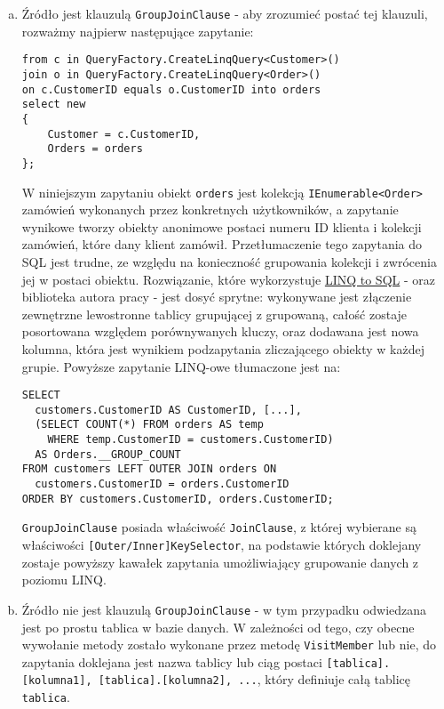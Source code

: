 \begin{enumerate}[a)]
\item Źródło jest klauzulą \texttt{GroupJoinClause} - aby zrozumieć postać tej klauzuli, rozważmy najpierw następujące zapytanie:

\begin{lstlisting}
from c in QueryFactory.CreateLinqQuery<Customer>()
join o in QueryFactory.CreateLinqQuery<Order>()
on c.CustomerID equals o.CustomerID into orders
select new
{
    Customer = c.CustomerID,
    Orders = orders
};
\end{lstlisting}

W niniejszym zapytaniu obiekt \texttt{orders} jest kolekcją \texttt{IEnumerable<Order>} zamówień wykonanych przez konkretnych użytkowników, a zapytanie wynikowe tworzy obiekty anonimowe postaci numeru ID klienta i kolekcji zamówień, które dany klient zamówił. Przetłumaczenie tego zapytania do SQL jest trudne, ze względu na konieczność grupowania kolekcji i zwrócenia jej w postaci obiektu. Rozwiązanie, które wykorzystuje \href{https://msdn.microsoft.com/pl-pl/library/bb882643(v=vs.110).aspx}{LINQ to SQL} - oraz biblioteka autora pracy - jest dosyć sprytne: wykonywane jest złączenie zewnętrzne lewostronne tablicy grupującej z grupowaną, całość zostaje posortowana względem porównywanych kluczy, oraz dodawana jest nowa kolumna, która jest wynikiem podzapytania zliczającego obiekty w każdej grupie. Powyższe zapytanie LINQ-owe tłumaczone jest na:

\begin{lstlisting}
SELECT 
  customers.CustomerID AS CustomerID, [...], 
  (SELECT COUNT(*) FROM orders AS temp 
    WHERE temp.CustomerID = customers.CustomerID) 
  AS Orders.__GROUP_COUNT
FROM customers LEFT OUTER JOIN orders ON 
  customers.CustomerID = orders.CustomerID
ORDER BY customers.CustomerID, orders.CustomerID;
\end{lstlisting}

\texttt{GroupJoinClause} posiada właściwość \texttt{JoinClause}, z której wybierane są właściwości \texttt{[Outer/Inner]KeySelector}, na podstawie których doklejany zostaje powyższy kawałek zapytania umożliwiający grupowanie danych z poziomu LINQ.

\item Źródło nie jest klauzulą \texttt{GroupJoinClause} - w tym przypadku odwiedzana jest po prostu tablica w bazie danych. W zależności od tego, czy obecne wywołanie metody zostało wykonane przez metodę \texttt{VisitMember} lub nie, do zapytania doklejana jest nazwa tablicy lub ciąg postaci \texttt{[tablica].[kolumna1], [tablica].[kolumna2], ...}, który definiuje całą tablicę \texttt{tablica}.
\end{enumerate}

